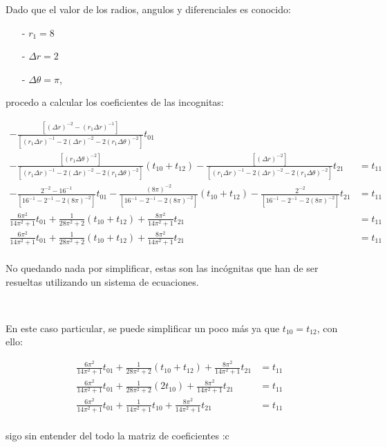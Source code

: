 \documentclass{article}
\begin{document}
\newpage

\noindent Dado que el valor de los radios, angulos y diferenciales es conocido: 

\begin{itemize}
    \item[-] $r_1 = 8$
    \item[-] $\Delta r = 2$ 
    \item[-] $\Delta\theta = \pi$,
\end{itemize}

procedo a calcular los coeficientes de las incognitas:

\begin{align*}
    -\frac{[{(\Delta r)}^{-2} - {(r_1\Delta r)}^{-1}]}{[{(r_1\Delta r)}^{-1} - 2{(\Delta r)}^{-2} - 2{(r_{1}\Delta \theta)}^{-2}]}t_{01}
    & \\
    -\frac{[{(r_{1}\Delta \theta)}^{-2}]}{[{(r_1\Delta r)}^{-1} - 2{(\Delta r)}^{-2} - 2{(r_{1}\Delta \theta)}^{-2}]}(t_{10} + t_{12})
    -\frac{[{(\Delta r)}^{-2}]}{[{(r_1\Delta r)}^{-1} - 2{(\Delta r)}^{-2} - 2{(r_{1}\Delta \theta)}^{-2}]}t_{21} &= t_{11} \\
    -\frac{2^{-2} - 16^{-1}}{[16^{-1} - 2^{-1} - 2{(8\pi)}^{-2}]}t_{01}
    -\frac{{(8\pi)}^{-2}}{[16^{-1} - 2^{-1} - 2{(8\pi)}^{-2}]}(t_{10} + t_{12})
    -\frac{2^{-2}}{[16^{-1} - 2^{-1} - 2{(8\pi)}^{-2}]}t_{21} &= t_{11} \\
    \frac{6\pi^2}{14\pi^2 + 1}t_{01}
    +\frac{1}{28\pi^2 + 2}(t_{10} + t_{12})
    +\frac{8\pi^2}{14\pi^2 + 1}t_{21} &= t_{11} \\
    \frac{6\pi^2}{14\pi^2 + 1}t_{01}
    +\frac{1}{28\pi^2 + 2}(t_{10} + t_{12})
    +\frac{8\pi^2}{14\pi^2 + 1}t_{21} &= t_{11} \\
\end{align*}

\noindent No quedando nada por simplificar, estas son las incógnitas que han de ser resueltas utilizando un sistema de ecuaciones.

\

En este caso particular, se puede simplificar un poco más ya que $t_{10} = t_{12}$, con ello:


\begin{align*}
    \frac{6\pi^2}{14\pi^2 + 1}t_{01}
    +\frac{1}{28\pi^2 + 2}(t_{10} + t_{12})
    +\frac{8\pi^2}{14\pi^2 + 1}t_{21} &= t_{11} \\
    \frac{6\pi^2}{14\pi^2 + 1}t_{01}
    +\frac{1}{28\pi^2 + 2}(2t_{10})
    +\frac{8\pi^2}{14\pi^2 + 1}t_{21} &= t_{11} \\
    \frac{6\pi^2}{14\pi^2 + 1}t_{01}
    +\frac{1}{14\pi^2 + 1}t_{10}
    +\frac{8\pi^2}{14\pi^2 + 1}t_{21} &= t_{11} \\
\end{align*}

\noindent sigo sin entender del todo la matriz de coeficientes :c
\end{document}
